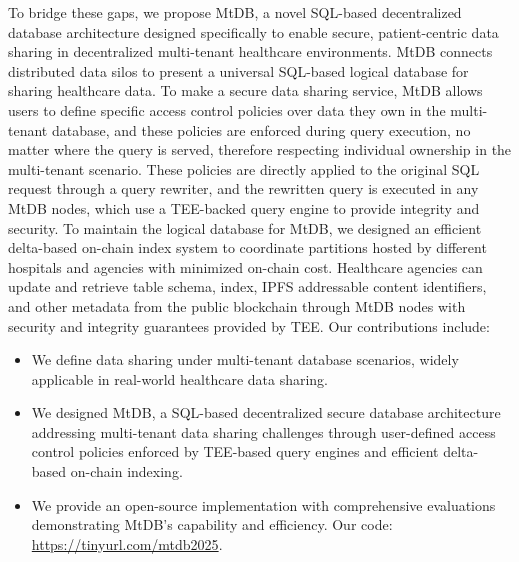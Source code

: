 \documentclass[conference]{IEEEtran}
\newcommand{\ours}{\xspace MtDB\xspace}
\begin{document}
To bridge these gaps, we propose \ours, a novel SQL-based decentralized database architecture designed specifically to enable secure, patient-centric data sharing in decentralized multi-tenant healthcare environments. \ours connects distributed data silos to present a universal SQL-based logical database for sharing healthcare data. To make a secure data sharing service, \ours allows users to define specific access control policies over data they own in the multi-tenant database, and these policies are enforced during query execution, no matter where the query is served, therefore respecting individual ownership in the multi-tenant scenario. These policies are directly applied to the original SQL request through a query rewriter, and the rewritten query is executed in any \ours nodes, which use a TEE-backed query engine to provide integrity and security. To maintain the logical database for \ours, we designed an efficient delta-based on-chain index system to coordinate partitions hosted by different hospitals and agencies with minimized on-chain cost. Healthcare agencies can update and retrieve table schema, index, IPFS addressable content identifiers, and other metadata from the public blockchain through \ours nodes with security and integrity guarantees provided by TEE. Our contributions include:
\begin{itemize}
    \item We define data sharing under multi-tenant database scenarios, widely applicable in real-world healthcare data sharing.
    \item We designed \ours, a SQL-based decentralized secure database architecture addressing multi-tenant data sharing challenges through user-defined access control policies enforced by TEE-based query engines and efficient delta-based on-chain indexing.
    \item We provide an open-source implementation with comprehensive evaluations demonstrating \ours's capability and efficiency. Our code: \url{https://tinyurl.com/mtdb2025}.
\end{itemize}

\end{document}
